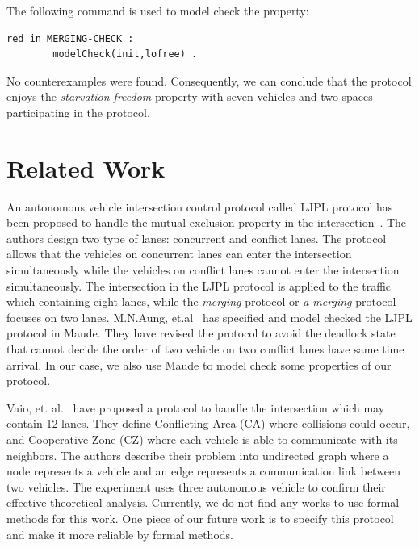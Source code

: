 \documentclass[10pt, conference, compsocconf]{IEEEtran}
\begin{document}
The following command is used to model check the property:
\begin{small}
\begin{verbatim}
red in MERGING-CHECK : 
        modelCheck(init,lofree) .
\end{verbatim}
\end{small}

\noindent
No counterexamples were found. 
Consequently, we can conclude that the protocol enjoys the \textit{starvation freedom} 
property with seven vehicles and two spaces participating in the protocol.
 
\section{Related Work}
 \label{sect_Relate}
 
An autonomous vehicle intersection control protocol called LJPL protocol has 
been proposed to handle the mutual exclusion property in the intersection~\cite{LimJongBeom2018Aedm}.
The authors design two type of lanes: concurrent and conflict lanes. 
The protocol allows that the vehicles on concurrent lanes can enter the 
intersection simultaneously while the vehicles on conflict lanes cannot 
enter the intersection simultaneously.
The intersection in the LJPL protocol is applied to the traffic which 
containing eight lanes, while the \textit{merging} protocol or \textit{a-merging} 
protocol focuses on two lanes.
M.N.Aung, et.al~\cite{DBLP:conf/seke/AungP019} has specified and model 
checked the LJPL protocol in Maude.
They have revised the protocol to avoid the deadlock state that cannot 
decide the order of two vehicle on two conflict lanes have same time arrival.
In our case, we also use Maude to model check some properties of our protocol.

Vaio, et. al.~\cite{8790807} have proposed a protocol to handle the 
intersection which may contain 12 lanes.
They define Conflicting Area (CA) where collisions could occur, and 
Cooperative Zone (CZ) where each vehicle is able to communicate with its neighbors. 
The authors describe their problem into undirected graph where a node 
represents a vehicle and an edge represents a communication link between two vehicles.
The experiment uses three autonomous vehicle to confirm their effective theoretical analysis.
Currently, we do not find any works to use formal methods for this work.
One piece of our future work is to specify this protocol and make 
it more reliable by formal methods.
 
\end{document}
